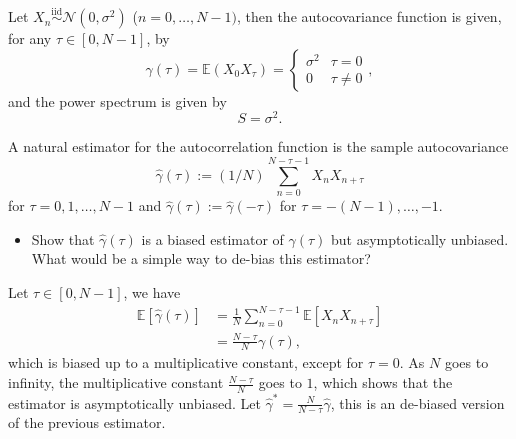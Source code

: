 \documentclass[11pt]{article}
\begin{document}
\begin{solution}
    Let $X_n \overset{\mathrm{iid}}{\sim} \mathcal{N}(0, \sigma^2)$ ($n=0,\ldots, N-1)$, then the autocovariance function is given, for any $\tau\in [0, N-1]$, by
    \begin{equation}
        \gamma(\tau) = \mathbb{E}(X_0 X_{\tau}) =  \left\{
    \begin{array}{ll}
        \sigma^2 & \tau = 0 \\
        0 & \tau \neq 0
    \end{array},
\right.
    \end{equation}
    and the power spectrum is given by
    \begin{equation}
        S = \sigma^2.
    \end{equation}
\end{solution}


\begin{exercise}
A natural estimator for the autocorrelation function is the sample autocovariance
\begin{equation}
    \hat{\gamma}(\tau) := (1/N) \sum_{n=0}^{N-\tau-1} X_n X_{n+\tau}
\end{equation}
for $\tau=0,1,\dots,N-1$ and $\hat{\gamma}(\tau):=\hat{\gamma}(-\tau)$ for $\tau=-(N-1),\dots,-1$.
\begin{itemize}
    \item Show that $\hat{\gamma}(\tau)$ is a biased estimator of $\gamma(\tau)$ but asymptotically unbiased.
    What would be a simple way to de-bias this estimator?
\end{itemize}

\end{exercise}

\begin{solution}
Let $\tau \in [0, N-1]$, we have
\begin{equation}
    \begin{split}
        \mathbb{E}[\hat{\gamma}(\tau)] &= \frac{1}{N}\sum_{n=0}^{N-\tau-1}\mathbb{E}[X_n X_{n+\tau}]\\
                                    &= \frac{N-\tau}{N}\gamma(\tau),
    \end{split}
\end{equation}
which is biased up to a multiplicative constant, except for $\tau = 0$. As $N$ goes to infinity, the multiplicative constant $\frac{N-\tau}{N}$ goes to $1$, which shows that the estimator is asymptotically unbiased. Let $\hat{\gamma}^* = \frac{N}{N-\tau}\hat{\gamma}$, this is an de-biased version of the previous estimator.
\end{solution}
\end{document}
